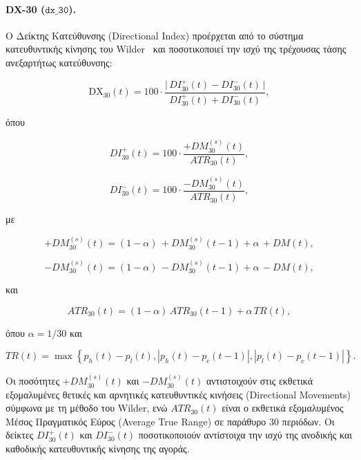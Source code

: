 \paragraph{DX-30 ($\mathtt{dx\_30}$).}
Ο Δείκτης Κατεύθυνσης (Directional Index) προέρχεται από το σύστημα
κατευθυντικής κίνησης του Wilder~\cite{wilder1978} και ποσοτικοποιεί την ισχύ της
τρέχουσας τάσης ανεξαρτήτως κατεύθυνσης:

\begin{equation}
  \mathrm{DX}_{30}(t) = 100 \cdot
    \frac{\bigl|\, DI^{+}_{30}(t) - DI^{-}_{30}(t)\,\bigr|}
         {DI^{+}_{30}(t) + DI^{-}_{30}(t)},
  \label{eq:dx}
\end{equation}

όπου

\begin{equation}
DI^{+}_{30}(t)
=
100 \cdot
\frac{+DM^{(s)}_{30}(t)}
     {ATR_{30}(t)},
\end{equation}

\begin{equation}
DI^{-}_{30}(t)
=
100 \cdot
\frac{-DM^{(s)}_{30}(t)}
     {ATR_{30}(t)},
\end{equation}

με

\begin{equation}
+DM^{(s)}_{30}(t)
=
(1-\alpha)\,+DM^{(s)}_{30}(t-1)
+
\alpha\, +DM(t),
\end{equation}

\begin{equation}
-DM^{(s)}_{30}(t)
=
(1-\alpha)\,-DM^{(s)}_{30}(t-1)
+
\alpha\, -DM(t),
\end{equation}

και

\begin{equation}
ATR_{30}(t)
=
(1-\alpha)\,ATR_{30}(t-1)
+
\alpha\,TR(t),
\end{equation}

όπου $\alpha = 1/30$ και

\begin{equation}
TR(t)
=
\max\!\left\{
p_h(t)-p_l(t),
\left|p_h(t)-p_c(t-1)\right|,
\left|p_l(t)-p_c(t-1)\right|
\right\}.
\end{equation}

Οι ποσότητες $+DM^{(s)}_{30}(t)$ και $-DM^{(s)}_{30}(t)$ αντιστοιχούν στις
εκθετικά εξομαλυμένες θετικές και αρνητικές κατευθυντικές κινήσεις
(Directional Movements) σύμφωνα με τη μέθοδο του Wilder, ενώ
$ATR_{30}(t)$ είναι ο εκθετικά εξομαλυμένος Μέσος Πραγματικός Εύρος
(Average True Range) σε παράθυρο 30 περιόδων. Οι δείκτες
$DI^{+}_{30}(t)$ και $DI^{-}_{30}(t)$ ποσοτικοποιούν αντίστοιχα την ισχύ
της ανοδικής και καθοδικής κατευθυντικής κίνησης της αγοράς.

